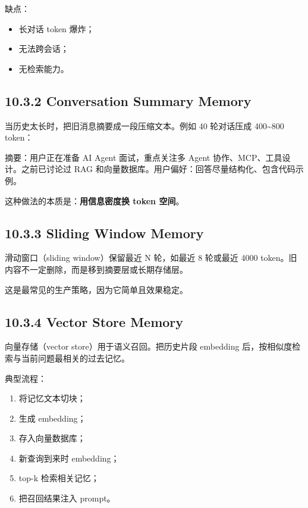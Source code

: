 缺点：


\begin{itemize}[leftmargin=2em]
\item 长对话 token 爆炸；
\item 无法跨会话；
\item 无检索能力。
\end{itemize}

\subsection{10.3.2 Conversation Summary Memory}

当历史太长时，把旧消息摘要成一段压缩文本。例如 40 轮对话压成 400\textasciitilde{}800 token：


\begin{codeblock}
摘要：用户正在准备 AI Agent 面试，重点关注多 Agent 协作、MCP、工具设计。之前已讨论过 RAG 和向量数据库。用户偏好：回答尽量结构化、包含代码示例。
\end{codeblock}

这种做法的本质是：\textbf{用信息密度换 token 空间}。


\subsection{10.3.3 Sliding Window Memory}

滑动窗口（sliding window）保留最近 N 轮，如最近 8 轮或最近 4000 token。旧内容不一定删除，而是移到摘要层或长期存储层。


这是最常见的生产策略，因为它简单且效果稳定。


\subsection{10.3.4 Vector Store Memory}

向量存储（vector store）用于语义召回。把历史片段 embedding 后，按相似度检索与当前问题最相关的过去记忆。


典型流程：


\begin{enumerate}[leftmargin=2em]
\item 将记忆文本切块；
\item 生成 embedding；
\item 存入向量数据库；
\item 新查询到来时 embedding；
\item top-k 检索相关记忆；
\item 把召回结果注入 prompt。
\end{enumerate}

